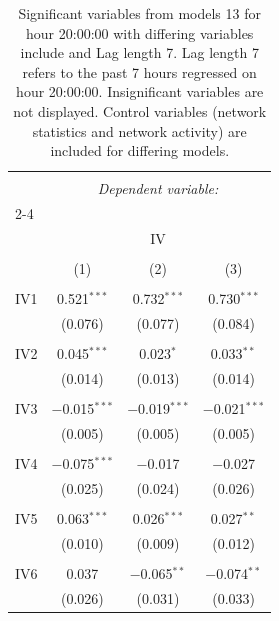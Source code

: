
\begin{table}[!htbp] \centering 
  \caption{Significant variables from models 13 for hour 20:00:00 with differing variables include 
                               and Lag length 7. Lag length 7 refers to the past 7 hours regressed on hour 20:00:00. 
                               Insignificant variables are not displayed. 
                               Control variables (network statistics and network activity) are 
                               included for differing models.} 
  \label{IVmodels2_t_hourlagged7} 
\scriptsize 
\begin{tabular}{@{\extracolsep{5pt}}lccc} 
\\[-1.8ex]\hline 
\hline \\[-1.8ex] 
 & \multicolumn{3}{c}{\textit{Dependent variable:}} \\ 
\cline{2-4} 
\\[-1.8ex] & \multicolumn{3}{c}{IV} \\ 
\\[-1.8ex] & (1) & (2) & (3)\\ 
\hline \\[-1.8ex] 
 IV1 & 0.521$^{***}$ & 0.732$^{***}$ & 0.730$^{***}$ \\ 
  & (0.076) & (0.077) & (0.084) \\ 
  & & & \\ 
 IV2 & 0.045$^{***}$ & 0.023$^{*}$ & 0.033$^{**}$ \\ 
  & (0.014) & (0.013) & (0.014) \\ 
  & & & \\ 
 IV3 & $-$0.015$^{***}$ & $-$0.019$^{***}$ & $-$0.021$^{***}$ \\ 
  & (0.005) & (0.005) & (0.005) \\ 
  & & & \\ 
 IV4 & $-$0.075$^{***}$ & $-$0.017 & $-$0.027 \\ 
  & (0.025) & (0.024) & (0.026) \\ 
  & & & \\ 
 IV5 & 0.063$^{***}$ & 0.026$^{***}$ & 0.027$^{**}$ \\ 
  & (0.010) & (0.009) & (0.012) \\ 
  & & & \\ 
 IV6 & 0.037 & $-$0.065$^{**}$ & $-$0.074$^{**}$ \\ 
  & (0.026) & (0.031) & (0.033) \\ 

\end{tabular}
\end{table}
